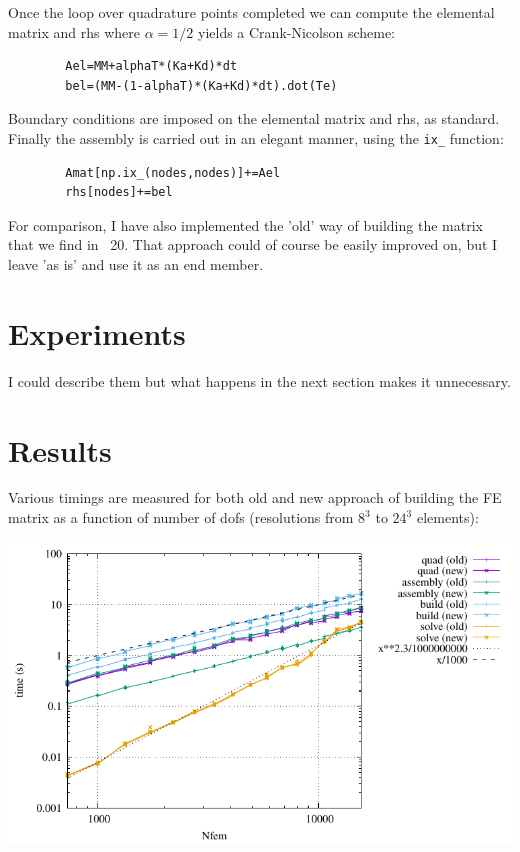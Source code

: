 Once the loop over quadrature points completed
we can compute the elemental matrix and rhs where
$\alpha=1/2$ yields a Crank-Nicolson scheme: 
\begin{lstlisting}
        Ael=MM+alphaT*(Ka+Kd)*dt
        bel=(MM-(1-alphaT)*(Ka+Kd)*dt).dot(Te)
\end{lstlisting}

Boundary conditions are imposed on the elemental matrix and rhs, as standard.
Finally the assembly is carried out in an elegant manner, using the \lstinline{ix_}
function:

\begin{lstlisting}
        Amat[np.ix_(nodes,nodes)]+=Ael
        rhs[nodes]+=bel
\end{lstlisting}

For comparison, I have also implemented the 'old' way of building the 
matrix that we find in \stone~20. That approach could of course be 
easily improved on, but I leave 'as is' and use it as an end member.

\section*{Experiments}

I could describe them but what happens in the next section 
makes it unnecessary.

\newpage
\section*{Results}

Various timings are measured for both old and new approach 
of building the FE matrix as a function of number of dofs (resolutions 
from $8^3$ to $24^3$ elements):

\begin{center}
\includegraphics[width=15cm]{python_codes/fieldstone_177/results/times.pdf}
\end{center}

